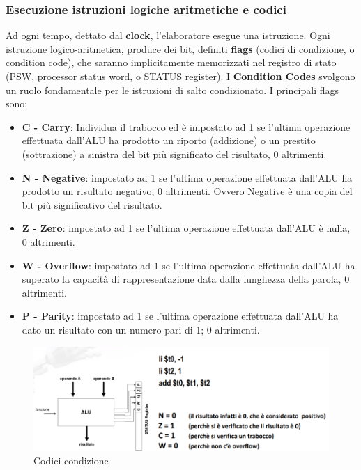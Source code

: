 \documentclass[12pt]{article}
\begin{document}
\subsubsection{Esecuzione istruzioni logiche aritmetiche e codici}
Ad ogni tempo, dettato dal \textbf{clock}, l’elaboratore esegue una istruzione. Ogni istruzione logico-aritmetica, produce dei bit, definiti \textbf{flags} (codici di condizione, o condition code), che saranno implicitamente memorizzati nel registro di stato (PSW, processor status word, o STATUS register).
I \textbf{Condition Codes} svolgono un ruolo fondamentale per le istruzioni di salto condizionato.
\newpage
I principali flags sono:
\begin{itemize}
    \item \textbf{C - Carry}: Individua il trabocco ed è impostato ad 1 se l’ultima operazione effettuata dall’ALU ha prodotto un riporto (addizione) o un prestito (sottrazione) a sinistra del bit più significato del risultato, 0 altrimenti.
    \item \textbf{N - Negative}: impostato ad 1 se l’ultima operazione effettuata dall’ALU ha prodotto un risultato negativo, 0 altrimenti. Ovvero Negative è una copia del bit più significativo del risultato.
    \item \textbf{Z - Zero}: impostato ad 1 se l’ultima operazione effettuata dall’ALU è nulla, 0 altrimenti.
    \item \textbf{W - Overflow}: impostato ad 1 se l’ultima operazione effettuata dall’ALU ha superato la capacità di rappresentazione data dalla lunghezza della parola, 0 altrimenti.
    \item \textbf{P - Parity}: impostato ad 1 se l’ultima operazione effettuata dall’ALU ha dato un risultato con un numero pari di 1; 0 altrimenti.
\end{itemize}
\begin{figure}[h]
    \centering
    \includegraphics[width=1\linewidth]{flas.png}
    \caption{Codici condizione}
    \label{fig:enter-label}
\end{figure}
\newpage
\end{document}
